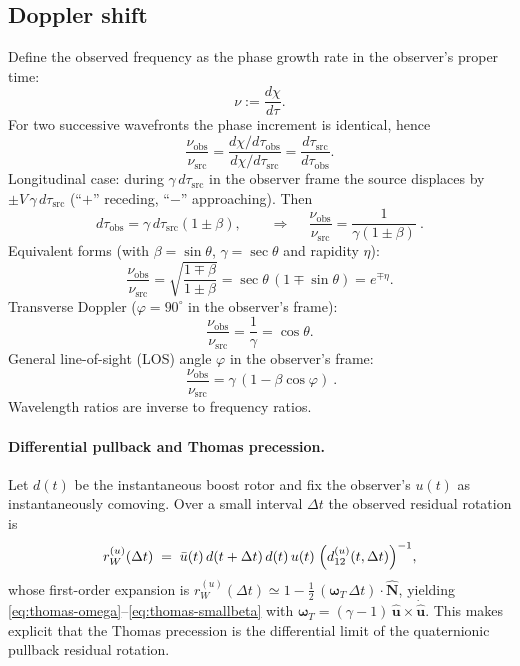 \documentclass[11pt]{article}
\numberwithin{equation}{section}
\begin{document}
\subsection{Doppler shift}
Define the observed frequency as the phase growth rate in the observer's proper time:
\begin{equation}
\nu:=\frac{d\chi}{d\tau}.
\label{eq:381}
\end{equation}
For two successive wavefronts the phase increment is identical, hence
\begin{equation}
\frac{\nu_{\mathrm{obs}}}{\nu_{\mathrm{src}}}
=\frac{d\chi/d\tau_{\mathrm{obs}}}{d\chi/d\tau_{\mathrm{src}}}
=\frac{d\tau_{\mathrm{src}}}{d\tau_{\mathrm{obs}}}.
\label{eq:382}
\end{equation}
Longitudinal case: during $\gamma\,d\tau_{\mathrm{src}}$ in the observer frame the source displaces by $\pm V\,\gamma\,d\tau_{\mathrm{src}}$ (``$+$'' receding, ``$-$'' approaching). Then
\begin{equation}
d\tau_{\mathrm{obs}}=\gamma\,d\tau_{\mathrm{src}}(1\pm\beta),\qquad
\Rightarrow\quad
\boxed{\ \frac{\nu_{\mathrm{obs}}}{\nu_{\mathrm{src}}}=\frac{1}{\gamma(1\pm\beta)}\ }.
\label{eq:384}
\end{equation}
Equivalent forms (with $\beta=\sin\theta$, $\gamma=\sec\theta$ and rapidity $\eta$):
\begin{equation}
\frac{\nu_{\mathrm{obs}}}{\nu_{\mathrm{src}}}
=\sqrt{\frac{1\mp\beta}{1\pm\beta}}
=\sec\theta\,(1\mp\sin\theta)
=e^{\mp\eta}.
\label{eq:385}
\end{equation}
Transverse Doppler ($\varphi=90^\circ$ in the observer's frame):
\begin{equation}
\frac{\nu_{\mathrm{obs}}}{\nu_{\mathrm{src}}}=\frac{1}{\gamma}=\cos\theta.
\label{eq:389}
\end{equation}
General line-of-sight (LOS) angle $\varphi$ in the observer's frame:
\begin{equation}
\boxed{\ \frac{\nu_{\mathrm{obs}}}{\nu_{\mathrm{src}}}=\gamma\,(1-\beta\cos\varphi)\ }.
\label{eq:3810}
\end{equation}
Wavelength ratios are inverse to frequency ratios.



\paragraph{Differential pullback and Thomas precession.}
Let $d(t)$ be the instantaneous boost rotor and fix the observer's $u(t)$ as
instantaneously comoving. Over a small interval $\Delta t$ the observed residual
rotation is
\begin{equation}
r_W^{(u)}(\Delta t)\;=\;
\bar u(t)\, d(t+\Delta t)\,d(t)\, u(t)\; \Bigl(d^{(u)}_{12}(t,\Delta t)\Bigr)^{-1},
\end{equation}
whose first-order expansion is $r_W^{(u)}(\Delta t)\simeq
1-\tfrac{1}{2}\,(\boldsymbol{\omega}_T\,\Delta t)\!\cdot\!\hat{\mathbf N}$, yielding
\eqref{eq:thomas-omega}--\eqref{eq:thomas-smallbeta} with
$\boldsymbol{\omega}_T=(\gamma-1)\,\hat{\mathbf u}\times\dot{\hat{\mathbf u}}$.
This makes explicit that the Thomas precession is the differential limit of the
quaternionic pullback residual rotation.
\end{document}
